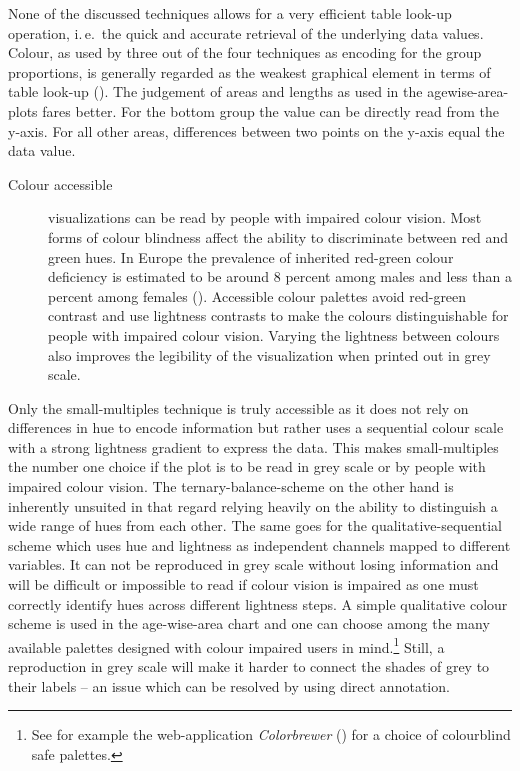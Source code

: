 \documentclass[parskip=half]{scrartcl}
\begin{document}
None of the discussed techniques allows for a very efficient table look-up operation, i.\,e.~the quick and accurate retrieval of the underlying data values. Colour, as used by three out of the four techniques as encoding for the group proportions, is generally regarded as the weakest graphical element in terms of table look-up (\cite{Cleveland1984}). The judgement of areas and lengths as used in the agewise-area-plots fares better. For the bottom group the value can be directly read from the y-axis. For all other areas, differences between two points on the y-axis equal the data value.

\begin{description}
  \item[Colour accessible] visualizations can be read by people with impaired colour vision. Most forms of colour blindness affect the ability to discriminate between red and green hues. In Europe the prevalence of inherited red-green colour deficiency is estimated to be around 8 percent among males and less than a percent among females (\cite{Birch2012}). Accessible colour palettes avoid red-green contrast and use lightness contrasts to make the colours distinguishable for people with impaired colour vision. Varying the lightness between colours also improves the legibility of the visualization when printed out in grey scale.
\end{description}

Only the small-multiples technique is truly accessible as it does not rely on differences in hue to encode information but rather uses a sequential colour scale with a strong lightness gradient to express the data. This makes small-multiples the number one choice if the plot is to be read in grey scale or by people with impaired colour vision. The ternary-balance-scheme on the other hand is inherently unsuited in that regard relying heavily on the ability to distinguish a wide range of hues from each other. The same goes for the qualitative-sequential scheme which uses hue and lightness as independent channels mapped to different variables. It can not be reproduced in grey scale without losing information and will be difficult or impossible to read if colour vision is impaired as one must correctly identify hues across different lightness steps. A simple qualitative colour scheme is used in the age-wise-area chart and one can choose among the many available palettes designed with colour impaired users in mind.\footnote{See for example the web-application \emph{Colorbrewer} (\cite{Brewer2016}) for a choice of colourblind safe palettes.} Still, a reproduction in grey scale will make it harder to connect the shades of grey to their labels -- an issue which can be resolved by using direct annotation.
\end{document}
